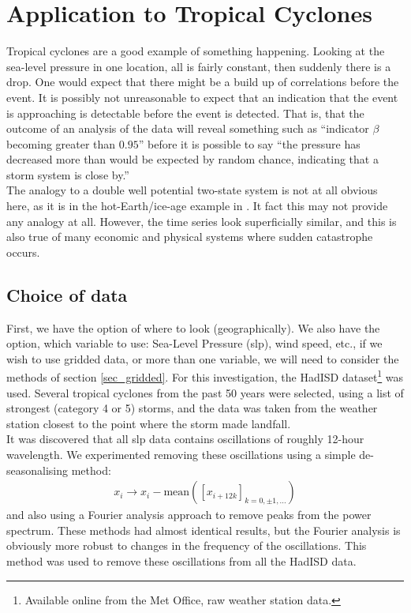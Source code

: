 \documentclass[11pt,a4paper,reqno]{article}
\numberwithin{equation}{section}
\begin{document}
\section{Application to Tropical Cyclones}
\label{sec_hurricanes}
Tropical cyclones are a good example of something happening. Looking at the sea-level pressure in one location, all is fairly constant, then suddenly there is a drop. One would expect that there might be a build up of correlations before the event. It is possibly not unreasonable to expect that an indication that the event is approaching is detectable before the event is detected. That is, that the outcome of an analysis of the data will reveal something such as ``indicator $\beta$ becoming greater than $0.95$'' before it is possible to say ``the pressure has decreased more than would be expected by random chance, indicating that a storm system is close by.''\\

The analogy to a double well potential two-state system is not at all obvious here, as it is in the hot-Earth/ice-age example in \cite{livina2011}. It fact this may not provide any analogy at all. However, the time series look superficially similar, and this is also true of many economic and physical systems where sudden catastrophe occurs.\\

\subsection{Choice of data}

First, we have the option of where to look (geographically). We also have the option, which variable to use: Sea-Level Pressure (slp), wind speed, etc., if we wish to use gridded data, or more than one variable, we will need to consider the methods of section \ref{sec_gridded}. For this investigation, the HadISD dataset\footnote{Available online from the Met Office, raw weather station data.} was used. Several tropical cyclones from the past 50 years were selected, using a list of strongest (category 4 or 5) storms, and the data was taken from the weather station closest to the point where the storm made landfall.\\

It was discovered that all slp data contains oscillations of roughly 12-hour wavelength. We experimented removing these oscillations using a simple de-seasonalising method:
\begin{align}
x_i \longrightarrow x_i - \text{mean}\left( [x_{i+12k}]_{k = 0, \pm 1, ...} \right)
\end{align}
and also using a Fourier analysis approach to remove peaks from the power spectrum. These methods had almost identical results, but the Fourier analysis is obviously more robust to changes in the frequency of the oscillations. This method was used to remove these oscillations from all the HadISD data.\\ 
\end{document}
